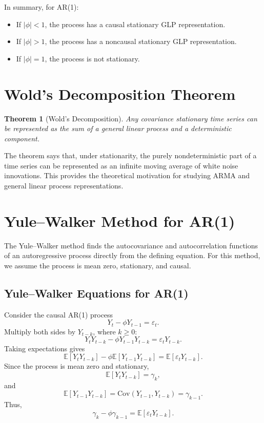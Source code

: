\documentclass[12pt,oneside]{book}
\numberwithin{equation}{section}
\theoremstyle{definition}
\theoremstyle{plain}
\newtheorem{theorem}{Theorem}[section]
\theoremstyle{remark}
\newcommand{\E}{\mathbb{E}}
\newcommand{\Cov}{\mathrm{Cov}}
\begin{document}
In summary, for AR(1):
\begin{itemize}
\item If $|\phi|<1$, the process has a causal stationary GLP representation.
\item If $|\phi|>1$, the process has a noncausal stationary GLP representation.
\item If $|\phi|=1$, the process is not stationary.
\end{itemize}

\section{Wold's Decomposition Theorem}

\begin{theorem}[Wold's Decomposition]
Any covariance stationary time series can be represented as the sum of a general linear process and a deterministic component.
\end{theorem}

The theorem says that, under stationarity, the purely nondeterministic part of a time series can be represented as an infinite moving average of white noise innovations. This provides the theoretical motivation for studying ARMA and general linear process representations.

\section{Yule--Walker Method for AR(1)}

The Yule--Walker method finds the autocovariance and autocorrelation functions of an autoregressive process directly from the defining equation. For this method, we assume the process is mean zero, stationary, and causal.

\subsection*{Yule--Walker Equations for AR(1)}

Consider the causal AR(1) process
\[
Y_t-\phi Y_{t-1}=\varepsilon_t.
\]
Multiply both sides by $Y_{t-k}$, where $k\geq 0$:
\[
Y_tY_{t-k}-\phi Y_{t-1}Y_{t-k}
=
\varepsilon_tY_{t-k}.
\]
Taking expectations gives
\[
\E[Y_tY_{t-k}]
-
\phi\E[Y_{t-1}Y_{t-k}]
=
\E[\varepsilon_tY_{t-k}].
\]
Since the process is mean zero and stationary,
\[
\E[Y_tY_{t-k}]=\gamma_k,
\]
and
\[
\E[Y_{t-1}Y_{t-k}]
=
\Cov(Y_{t-1},Y_{t-k})
=
\gamma_{k-1}.
\]
Thus,
\[
\gamma_k-\phi\gamma_{k-1}
=
\E[\varepsilon_tY_{t-k}].
\]
\end{document}
